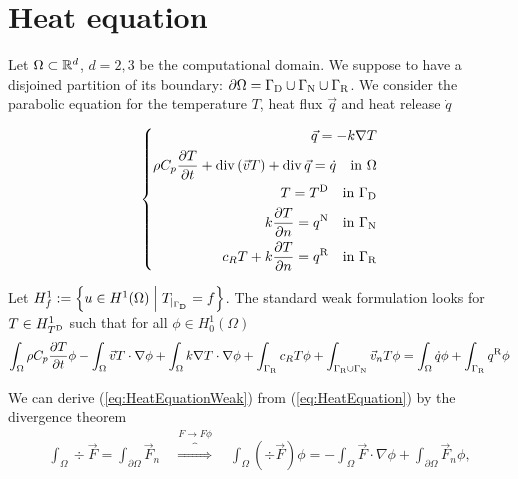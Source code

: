 %
\section{Heat equation}\label{sec:Heat}
%
Let $\Omega\subset \mathbb R^d$, $d=2,3$ be the computational domain. We suppose to have a disjoined partition of its boundary:
$\partial\Omega=\Gamma_{\rm D}\cup\Gamma_{\rm N}\cup\Gamma_{\rm R}$.
%
We consider the parabolic equation for the temperature $T$, heat flux $\vec{q}$ and heat release $\dot{q}$
%
\begin{yellow}
\begin{equation}\label{eq:HeatEquation}
%
\left\{
\begin{aligned}
\vec{q} = - \kdiff \nabla T\\
\rho C_p \dt{T} + \div\left(\vec{v} T\right)+\div\vec{q} = \dot{q} \quad \mbox{in $\Omega$}\\
T = \TD \quad \mbox{in $\GammaD$}\\
\kdiff\frac{\partial T}{\partial n} = \qN \quad \mbox{in $\GammaN$}\\
c_R T + \kdiff\frac{\partial T}{\partial n}= \qR \quad \mbox{in $\GammaR$}
\end{aligned}
\right.
%
\end{equation}
\end{yellow}
%
\begin{yellow}
Let $H^1_{f}:= \left\{u\in H^1(\Omega)\;\middle|\;{T}_{|_{\Gamma_{\rm D}}} = f\right\}$. The standard weak formulation looks for 
$T\in H^1_{T^{\rm D}}$ such that for all $\phi\in H^1_{0}(\Omega)$
%
\begin{equation}\label{eq:HeatEquationWeak}
\int_{\Omega}\rho C_p \frac{\partial T}{\partial t}\phi - \int_{\Omega}\vec{v} T\cdot \nabla \phi
+  \int_{\Omega} k\nabla T \cdot\nabla \phi + \int_{\Gamma_{\rm R}} c_R T \phi 
+ \int_{\Gamma_{\rm R}\cup\Gamma_{\rm N}} \vec{v}_n T \phi
= \int_{\Omega} \dot{q} \phi +  \int_{\Gamma_{\rm R}} q^{\rm R} \phi
\end{equation}
\end{yellow}
%
We can derive (\ref{eq:HeatEquationWeak}) from (\ref{eq:HeatEquation}) by the divergence theorem
%
\begin{align*}
\int_{\Omega} \div\vec{F} = \int_{\partial\Omega} \vec{F}_n\quad\overbrace{\Longrightarrow}^{F\to F\phi}\quad 
\int_{\Omega} (\div\vec{F}) \phi = -\int_{\Omega} \vec{F}\cdot \nabla\phi + \int_{\partial\Omega} \vec{F}_n\phi,
\end{align*}

